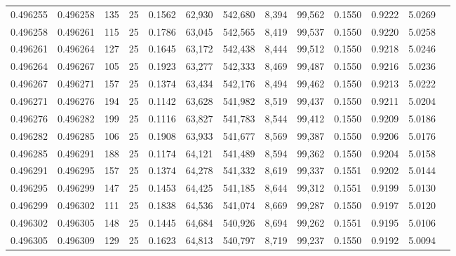 \begin{tabular}{rrrrrrrrrrrrr}
0.496255 & 0.496258 & 135 &  25 &                                     0.1562 &  62,930 & 542,680 &   8,394 &  99,562 & 0.1550 & 0.9222 & 5.0269 \\
0.496258 & 0.496261 & 115 &  25 &                                     0.1786 &  63,045 & 542,565 &   8,419 &  99,537 & 0.1550 & 0.9220 & 5.0258 \\
0.496261 & 0.496264 & 127 &  25 &                                     0.1645 &  63,172 & 542,438 &   8,444 &  99,512 & 0.1550 & 0.9218 & 5.0246 \\
0.496264 & 0.496267 & 105 &  25 &                                     0.1923 &  63,277 & 542,333 &   8,469 &  99,487 & 0.1550 & 0.9216 & 5.0236 \\
0.496267 & 0.496271 & 157 &  25 &                                     0.1374 &  63,434 & 542,176 &   8,494 &  99,462 & 0.1550 & 0.9213 & 5.0222 \\
0.496271 & 0.496276 & 194 &  25 &                                     0.1142 &  63,628 & 541,982 &   8,519 &  99,437 & 0.1550 & 0.9211 & 5.0204 \\
0.496276 & 0.496282 & 199 &  25 &                                     0.1116 &  63,827 & 541,783 &   8,544 &  99,412 & 0.1550 & 0.9209 & 5.0186 \\
0.496282 & 0.496285 & 106 &  25 &                                     0.1908 &  63,933 & 541,677 &   8,569 &  99,387 & 0.1550 & 0.9206 & 5.0176 \\
0.496285 & 0.496291 & 188 &  25 &                                     0.1174 &  64,121 & 541,489 &   8,594 &  99,362 & 0.1550 & 0.9204 & 5.0158 \\
0.496291 & 0.496295 & 157 &  25 &                                     0.1374 &  64,278 & 541,332 &   8,619 &  99,337 & 0.1551 & 0.9202 & 5.0144 \\
0.496295 & 0.496299 & 147 &  25 &                                     0.1453 &  64,425 & 541,185 &   8,644 &  99,312 & 0.1551 & 0.9199 & 5.0130 \\
0.496299 & 0.496302 & 111 &  25 &                                     0.1838 &  64,536 & 541,074 &   8,669 &  99,287 & 0.1550 & 0.9197 & 5.0120 \\
0.496302 & 0.496305 & 148 &  25 &                                     0.1445 &  64,684 & 540,926 &   8,694 &  99,262 & 0.1551 & 0.9195 & 5.0106 \\
0.496305 & 0.496309 & 129 &  25 &                                     0.1623 &  64,813 & 540,797 &   8,719 &  99,237 & 0.1550 & 0.9192 & 5.0094 \\

\end{tabular}
